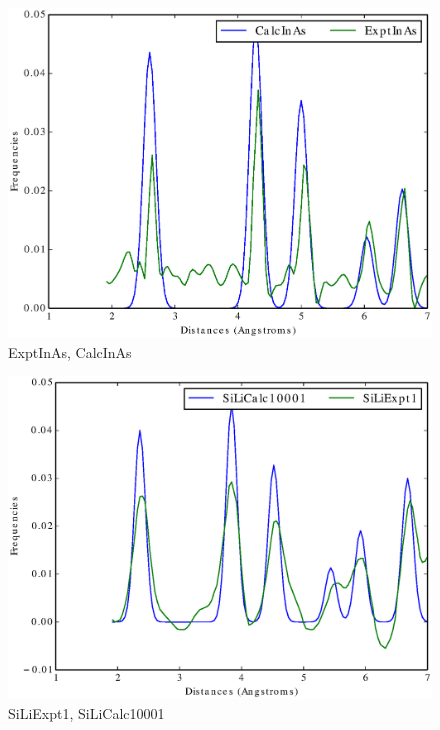 \documentclass[12pt,letterpaper]{article}
\begin{document}
\begin{figure}[ht]
  \begin{center}
    \includegraphics[scale=0.8]{figs/SparseRepExptInAs-CalcInAs.eps}
    \caption{ExptInAs, CalcInAs}
  \end{center}
\end{figure}

\begin{figure}[ht]
  \begin{center}
    \includegraphics[scale=0.8]{figs/SparseRepSiLiExpt1-SiLiCalc10001.eps}
    \caption{SiLiExpt1, SiLiCalc10001}
  \end{center}
\end{figure}
\end{document}
